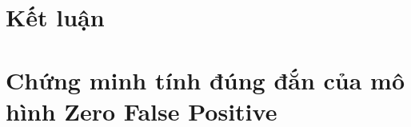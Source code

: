 \documentclass[12pt,a4paper]{report}
\begin{document}



\chapter{Kết luận}



\appendix
\chapter{Chứng minh tính đúng đắn của mô hình Zero False Positive}




\nocite{*}

\printbibliography[heading=bibintoc, title=Tài liệu tham khảo]

\end{document}
